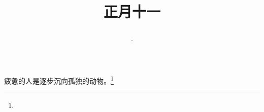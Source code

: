 \title{\date[d=20,m=2,y=2024][year:cn-y,年,month:cn,day:cn,日,·,weekday]·正月十一 }
疲惫的人是逐步沉向孤独的动物。\footnote{ }

